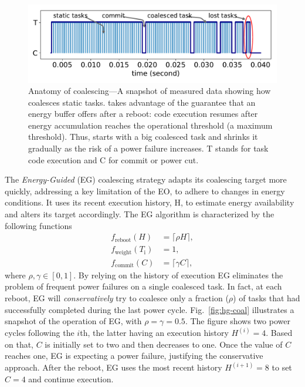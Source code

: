 \begin{figure}
\centering
\includegraphics[width=.8\columnwidth]{figures/dif_cap}
    \caption{Anatomy of \sys coalescing---A snapshot of measured data showing how \sys coalesces static tasks. \sys takes advantage of the guarantee that an energy buffer offers after a reboot: code execution resumes after energy accumulation reaches the operational threshold (a maximum threshold). Thus, \sys starts with a big coalesced task and shrinks it gradually as the risk of a power failure increases. T stands for task code execution and C for commit or power cut.}
    \label{fig:coal_anatomy}
\end{figure}

The \emph{Energy-Guided} (EG) coalescing strategy adapts its coalescing target more quickly, addressing a key limitation of the EO, to adhere to changes in energy conditions. It uses its recent execution history, H, to estimate energy availability and alters its target accordingly. The EG algorithm is characterized by the following functions
%
\begin{equation}
	\begin{split}
		 f_\text{reboot}(H) & = \lceil \rho H \rceil,\\
		 f_\text{weight}(T_\text{i}) & = 1, \\
		 f_\text{commit}(C) & = \lceil \gamma C \rceil,
	\end{split}
	\label{eq:eg}
\end{equation}
%
where $\rho, \gamma \in [0, 1]$. By relying on the history of execution EG eliminates the problem of frequent power failures on a single coalesced task. In fact, at each reboot, EG will {\em conservatively} try to coalesce only a fraction ($\rho$) of tasks that had successfully completed during the last power cycle.
Fig.~\ref{fig:hg-coal} illustrates a snapshot of the operation of EG, with $\rho = \gamma = 0.5$. The figure shows two power cycles following the $i$th, the latter having an execution history $H^{(i)} = 4$. Based on that, $C$ is initially set to two and then decreases to one. Once the value of $C$ reaches one, EG is expecting a power failure, justifying the conservative approach. After the reboot, EG uses the most recent history $H^{(i+1)} = 8$ to set $C = 4$ and continue execution.

